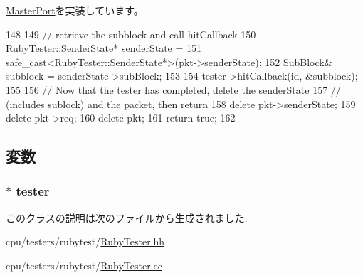\hyperlink{classMasterPort_abd323548d6c93f8b0543f1fe3a86ca35}{MasterPort}を実装しています。


\begin{DoxyCode}
148 {
149     // retrieve the subblock and call hitCallback
150     RubyTester::SenderState* senderState =
151         safe_cast<RubyTester::SenderState*>(pkt->senderState);
152     SubBlock& subblock = senderState->subBlock;
153 
154     tester->hitCallback(id, &subblock);
155 
156     // Now that the tester has completed, delete the senderState
157     // (includes sublock) and the packet, then return
158     delete pkt->senderState;
159     delete pkt->req;
160     delete pkt;
161     return true;
162 }
\end{DoxyCode}


\subsection{変数}
\hypertarget{classRubyTester_1_1CpuPort_a5f8ba0d5be58d6302adaccb375d74bc2}{
\subsubsection[{tester}]{$\ast$ {\bf tester}}}
\label{classRubyTester_1_1CpuPort_a5f8ba0d5be58d6302adaccb375d74bc2}


このクラスの説明は次のファイルから生成されました:\begin{DoxyCompactItemize}
\item 
cpu/testers/rubytest/\hyperlink{RubyTester_8hh}{RubyTester.hh}\item 
cpu/testers/rubytest/\hyperlink{RubyTester_8cc}{RubyTester.cc}\end{DoxyCompactItemize}
